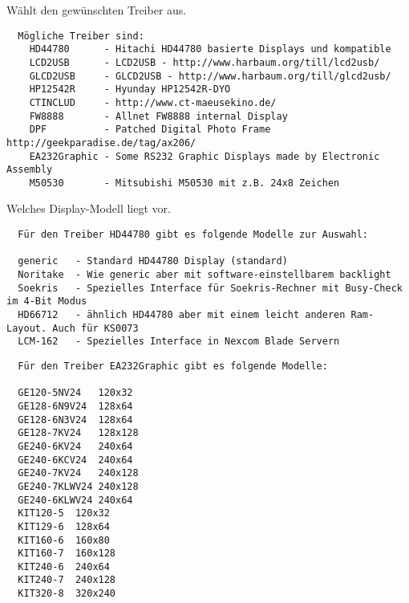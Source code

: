 \begin{description}

  Wählt den gewünschten Treiber aus.

\begin{example}
\begin{verbatim}
  Mögliche Treiber sind:
    HD44780      - Hitachi HD44780 basierte Displays und kompatible
    LCD2USB      - LCD2USB - http://www.harbaum.org/till/lcd2usb/
    GLCD2USB     - GLCD2USB - http://www.harbaum.org/till/glcd2usb/
    HP12542R     - Hyunday HP12542R-DYO
    CTINCLUD     - http://www.ct-maeusekino.de/
    FW8888       - Allnet FW8888 internal Display
    DPF          - Patched Digital Photo Frame http://geekparadise.de/tag/ax206/
    EA232Graphic - Some RS232 Graphic Displays made by Electronic Assembly
    M50530       - Mitsubishi M50530 mit z.B. 24x8 Zeichen
\end{verbatim}
\end{example}



  Welches Display-Modell liegt vor.

\begin{example}
\begin{verbatim}
  Für den Treiber HD44780 gibt es folgende Modelle zur Auswahl:

  generic	- Standard HD44780 Display (standard)
  Noritake	- Wie generic aber mit software-einstellbarem backlight
  Soekris	- Spezielles Interface für Soekris-Rechner mit Busy-Check im 4-Bit Modus
  HD66712	- ähnlich HD44780 aber mit einem leicht anderen Ram-Layout. Auch für KS0073
  LCM-162	- Spezielles Interface in Nexcom Blade Servern
\end{verbatim}
\end{example}

\begin{example}
\begin{verbatim}
  Für den Treiber EA232Graphic gibt es folgende Modelle:

  GE120-5NV24	120x32
  GE128-6N9V24	128x64
  GE128-6N3V24	128x64
  GE128-7KV24	128x128
  GE240-6KV24	240x64
  GE240-6KCV24	240x64
  GE240-7KV24	240x128
  GE240-7KLWV24	240x128
  GE240-6KLWV24	240x64
  KIT120-5	120x32
  KIT129-6	128x64
  KIT160-6	160x80
  KIT160-7	160x128
  KIT240-6	240x64
  KIT240-7	240x128
  KIT320-8	320x240
\end{verbatim}
\end{example}


\end{description}
